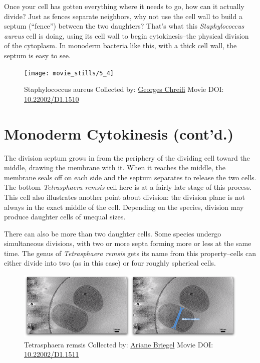 \documentclass[]{tufte-book}
\begin{document}
Once your cell has gotten everything where it needs to go, how can it
actually divide? Just as fences separate neighbors, why not use the cell
wall to build a septum (``fence'') between the two daughters? That's
what this \emph{Staphylococcus aureus} cell is doing, using its cell
wall to begin cytokinesis--the physical division of the cytoplasm. In
monoderm bacteria like this, with a thick cell wall, the septum is easy
to see.





\begin{figure}
\texttt{[image: movie\_stills/5\_4]} \caption[Staphylococcus aureus Collected by:
\protect\hyperlink{georges_chreifi}{Georges Chreifi} Movie DOI:
\href{https://doi.org/10.22002/D1.1510}{10.22002/D1.1510}]{Staphylococcus aureus Collected by:
\protect\hyperlink{georges_chreifi}{Georges Chreifi} Movie DOI:
\href{https://doi.org/10.22002/D1.1510}{10.22002/D1.1510}}\label{fig:5-4}
\end{figure}

\section{Monoderm Cytokinesis
(cont'd.)}\label{monoderm-cytokinesis-contd.}

The division septum grows in from the periphery of the dividing cell
toward the middle, drawing the membrane with it. When it reaches the
middle, the membrane seals off on each side and the septum separates to
release the two cells. The bottom \emph{Tetrasphaera remsis} cell here
is at a fairly late stage of this process. This cell also illustrates
another point about division: the division plane is not always in the
exact middle of the cell. Depending on the species, division may produce
daughter cells of unequal sizes.

There can also be more than two daughter cells. Some species undergo
simultaneous divisions, with two or more septa forming more or less at
the same time. The genus of \emph{Tetrasphaera remsis} gets its name
from this property--cells can either divide into two (as in this case)
or four roughly spherical cells.





\begin{figure}
\includegraphics{movie_stills/5_5} \caption[Tetrasphaera remsis Collected by:
\protect\hyperlink{ariane_briegel}{Ariane Briegel} Movie DOI:
\href{https://doi.org/10.22002/D1.1511}{10.22002/D1.1511}]{Tetrasphaera remsis Collected by:
\protect\hyperlink{ariane_briegel}{Ariane Briegel} Movie DOI:
\href{https://doi.org/10.22002/D1.1511}{10.22002/D1.1511}}\label{fig:5-5}
\end{figure}
\end{document}
